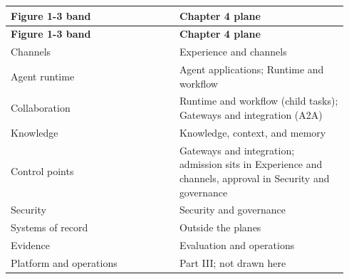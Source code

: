 \BookTableStart
\small
\begin{longtable}{@{}Y{0.4700\linewidth}Y{0.4700\linewidth}@{}}
\color{white}\bfseries Figure 1-3 band & \color{white}\bfseries Chapter 4 plane \\
\endfirsthead
{}
\color{white}\bfseries Figure 1-3 band & \color{white}\bfseries Chapter 4 plane \\
\endhead
Channels & Experience and channels \\
Agent runtime & Agent applications; Runtime and workflow \\
Collaboration & Runtime and workflow (child tasks); Gateways and integration (A2A) \\
Knowledge & Knowledge, context, and memory \\
Control points & Gateways and integration; admission sits in Experience and channels, approval in Security and governance \\
Security & Security and governance \\
Systems of record & Outside the planes \\
Evidence & Evaluation and operations \\
Platform and operations & Part III; not drawn here \\
\end{longtable}
\BookTableEnd

